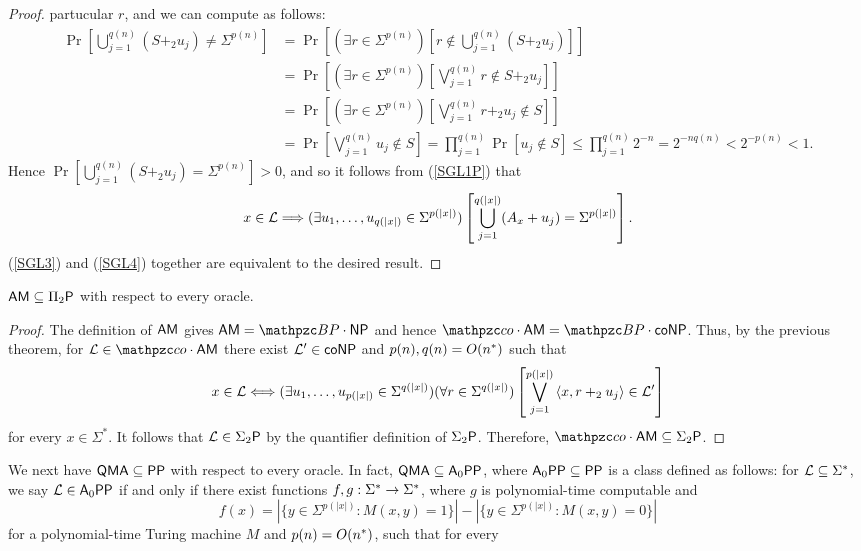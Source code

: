 \begin{proof}
partucular $r$, and we can compute as follows:
\begin{align*}
\Pr\left[\bigcup_{j=1}^{q(n)}(S+_2u_j)\neq\Sigma^{p(n)}\right]
&=\Pr\left[(\exists r\in\Sigma^{p(n)})\left[r\not\in\bigcup_{j=1}^{q(n)}
(S+_2u_j)\right]\right] \\
&=\Pr\left[(\exists r\in\Sigma^{p(n)})\left[\bigvee_{j=1}^{q(n)}r\not\in
S+_2u_j\right]\right] \\
&=\Pr\left[(\exists r\in\Sigma^{p(n)})\left[\bigvee_{j=1}^{q(n)}r+_2u_j\not\in
S\right]\right] \\
&=\Pr\left[\bigvee_{j=1}^{q(n)}u_j\not\in S\right]
=\prod_{j=1}^{q(n)}\Pr[u_j\not\in S]
\leq\prod_{j=1}^{q(n)}2^{-n}
=2^{-nq(n)}<2^{-p(n)}<1.
\end{align*}
Hence $\Pr[\bigcup_{j=1}^{q(n)}(S+_2u_j)=\Sigma^{p(n)}]>0$, and so it follows 
from (\ref{SGL1P}) that
\begin{equation} \label{SGL4}
x\in\mathcal{L}\Longrightarrow(\exists u_1,\ldots,u_{q(|x|)}\in\Sigma^{p(|x|)})
\left[\bigcup_{j=1}^{q(|x|)}(A_x+u_j)=\Sigma^{p(|x|)}\right].
\end{equation}
(\ref{SGL3}) and (\ref{SGL4}) together are equivalent to the desired result.
\end{proof}
\begin{corollary}
$\mathsf{AM}\subseteq\Pi_2\mathsf{P}$ with respect to every oracle.
\end{corollary}
\begin{proof}
The definition of $\mathsf{AM}$ gives $\msf{AM}=\cBP\cdot\NP$ and hence 
$\cco\cdot\msf{AM}=\cBP\cdot\co\NP$. Thus, by the previous theorem, for 
$\cL\in\cco\cdot\msf{AM}$ there exist $\mathcal{L}^\prime\in\mathsf{co}\mathsf{NP}$ and 
$p(n),q(n)=O(n^*)$ such that
\[
x\in\mathcal{L}\Longleftrightarrow
(\exists u_1,\ldots, u_{p(|x|)}\in\Sigma^{q(|x|)})
(\forall r\in\Sigma^{q(|x|)})
\left[\bigvee_{j=1}^{p(|x|)}\left\langle x,r+_2u_j\right\rangle\in\mathcal{L}^\prime\right]
\]
for every $x\in\Sigma^*$. It follows that $\mathcal{L}\in\Sigma_2\mathsf{P}$ by the quantifier 
definition of $\Sigma_2\mathsf{P}$. Therefore, $\cco\cdot\msf{AM}\subseteq\Sigma_2\sP$.
\end{proof}
We next have $\mathsf{QMA}\subseteq\mathsf{PP}$ \cite{vyalyi2003qma} with respect to 
every oracle. In fact, $\mathsf{QMA}\subseteq\mathsf{A}_0\mathsf{PP}$, where 
$\mathsf{A}_0\mathsf{PP}\subseteq\mathsf{PP}$ is a class defined as follows: for 
$\mathcal{L}\subseteq\Sigma^*$, we say $\mathcal{L}\in\mathsf{A}_0\mathsf{PP}$ if and only if there 
exist functions $f,g:\Sigma^*\rightarrow\Sigma^*$, where $g$ is polynomial-time 
computable and
\[
f(x)=|\{y\in\Sigma^{p(|x|)}:M(x,y)=1\}|-|\{y\in\Sigma^{p(|x|)}:M(x,y)=0\}|
\]
for a polynomial-time Turing machine $M$ and $p(n)=O(n^*)$, such that for every 
